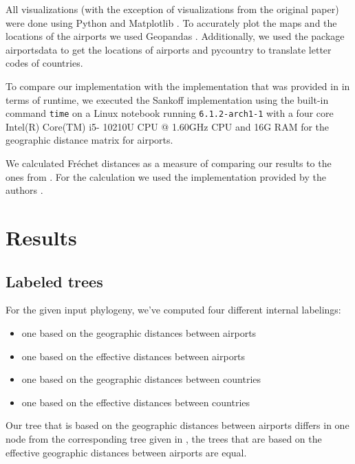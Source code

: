 \documentclass{article}
\begin{document}
All visualizations (with the exception of visualizations from the original paper) were done using Python and Matplotlib \cite{MatplotlibVisualizationPython}. To accurately plot the maps and the locations of the
airports we used Geopandas \cite{GeoPandas12GeoPandas}. Additionally, we used the package airportsdata \cite{borsettiAirportsdataExtensiveDatabase2022} to get the locations of
airports and pycountry \cite{theunePycountryISOCountry} to translate letter codes
of countries.

To compare our implementation with the implementation that
was provided in \cite{reimeringPhylogeographicReconstructionUsing2020} in terms of runtime, we
executed the Sankoff implementation using the built-in command \texttt{time} on
a Linux notebook running \texttt{6.1.2-arch1-1} with a four core Intel(R) Core(TM) i5-
10210U CPU @ 1.60GHz CPU and 16G RAM for the geographic distance matrix for airports.

We calculated Fr\'{e}chet distances as a measure of comparing our results to the ones from \cite{reimeringPhylogeographicReconstructionUsing2020}. For the calculation we used the implementation provided by the authors \cite{reimeringFrechetTreeDistance2018}.

\section{Results}

\subsection{Labeled trees}
For the given input phylogeny, we've computed four different internal labelings: 
\begin{itemize}
    \item one based on the geographic distances between airports
    \item one based on the effective distances between airports
    \item one based on the geographic distances between countries
    \item one based on the effective distances between countries
\end{itemize}

Our tree that is based on the geographic distances between airports differs in
one node from the corresponding tree given in
\cite{reimeringPhylogeographicReconstructionUsing2020}, the trees that are based
on the effective geographic distances between airports are equal.
\end{document}
